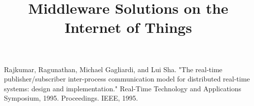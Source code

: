 \documentclass[conference]{IEEEtran}
\begin{document}
\title{Middleware Solutions on the Internet of Things}

\author{
}
\maketitle
\onehalfspace
\begin{abstract}
\end{abstract}

\begin{thebibliography}{1}

Rajkumar, Ragunathan, Michael Gagliardi, and Lui Sha. "The real-time publisher/subscriber inter-process communication model for distributed real-time systems: design and implementation." Real-Time Technology and Applications Symposium, 1995. Proceedings. IEEE, 1995.

\end{thebibliography}
\end{document}
